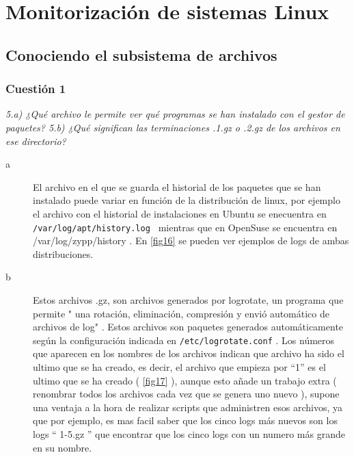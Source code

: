 



\maketitle %
\newpage %
\tableofcontents %
\listoffigures
\newpage

\section{Monitorización de sistemas Linux}
\subsection{Conociendo el subsistema de archivos}


\subsubsection{Cuestión 1}
\textit{5.a) ¿Qué archivo le permite ver qué programas se han instalado con el gestor de paquetes? 5.b) ¿Qué significan las terminaciones .1.gz o .2.gz de los archivos en ese directorio?}

\begin{description}
  \item[a] El archivo en el que se guarda el historial de los paquetes que se han instalado puede variar en función de la distribución de linux, por ejemplo el archivo con el historial de instalaciones en Ubuntu se enecuentra en \texttt{/var/log/apt/history.log } mientras que en OpenSuse se encuentra en /var/log/zypp/history \cite{log1} \cite{log2}. En \cref{fig16} se pueden ver ejemplos de logs de ambas distribuciones. 
  
  \item[b] Estos archivos .gz, son archivos generados por logrotate, un programa que permite " una rotación, eliminación, compresión y envió automático de archivos de log" \cite{logrot1}. Estos archivos son paquetes generados automáticamente según la configuración indicada en \texttt{/etc/logrotate.conf} \cite{logrot}. Los números que aparecen en los nombres de los archivos indican que archivo ha sido el ultimo que se ha creado, es decir, el archivo que empieza por ``1'' es el ultimo que se ha creado ( \cref{fig17} ), aunque esto añade un trabajo extra ( renombrar todos los archivos cada vez que se genera uno nuevo ), supone una ventaja a la hora de realizar scripts que administren esos archivos, ya que por ejemplo, es mas facil saber que los cinco logs más nuevos son los logs `` 1-5.gz '' que encontrar que los cinco logs con un numero más grande en su nombre.
\end{description}

